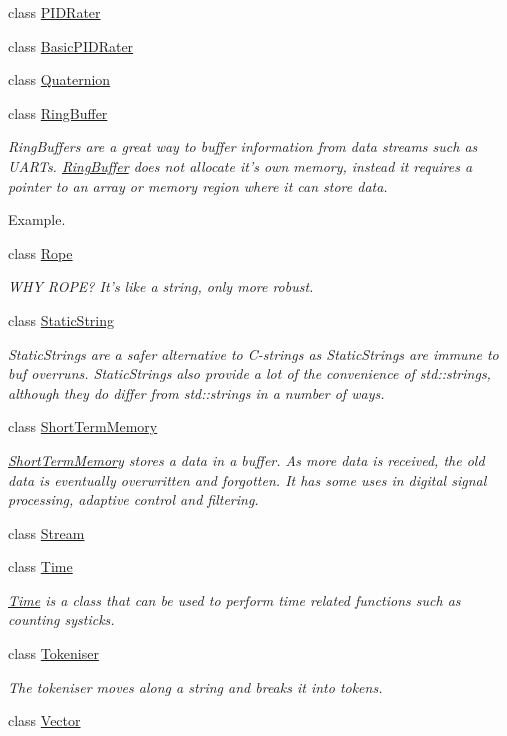\begin{DoxyCompactItemize}
class \hyperlink{classetk_1_1_p_i_d_rater}{P\-I\-D\-Rater}
\item 
class \hyperlink{classetk_1_1_basic_p_i_d_rater}{Basic\-P\-I\-D\-Rater}
\item 
class \hyperlink{classetk_1_1_quaternion}{Quaternion}
\item 
class \hyperlink{classetk_1_1_ring_buffer}{Ring\-Buffer}
\begin{DoxyCompactList}\small\item\em Ring\-Buffers are a great way to buffer information from data streams such as U\-A\-R\-Ts. \hyperlink{classetk_1_1_ring_buffer}{Ring\-Buffer} does not allocate it's own memory, instead it requires a pointer to an array or memory region where it can store data. \par
\par
 Example. \end{DoxyCompactList}\item 
class \hyperlink{classetk_1_1_rope}{Rope}
\begin{DoxyCompactList}\small\item\em W\-H\-Y R\-O\-P\-E? It's like a string, only more robust. \end{DoxyCompactList}\item 
class \hyperlink{classetk_1_1_static_string}{Static\-String}
\begin{DoxyCompactList}\small\item\em Static\-Strings are a safer alternative to C-\/strings as Static\-Strings are immune to buf overruns. Static\-Strings also provide a lot of the convenience of std\-::strings, although they do differ from std\-::strings in a number of ways. \end{DoxyCompactList}\item 
class \hyperlink{classetk_1_1_short_term_memory}{Short\-Term\-Memory}
\begin{DoxyCompactList}\small\item\em \hyperlink{classetk_1_1_short_term_memory}{Short\-Term\-Memory} stores a data in a buffer. As more data is received, the old data is eventually overwritten and forgotten. It has some uses in digital signal processing, adaptive control and filtering. \end{DoxyCompactList}\item 
class \hyperlink{classetk_1_1_stream}{Stream}
\item 
class \hyperlink{classetk_1_1_time}{Time}
\begin{DoxyCompactList}\small\item\em \hyperlink{classetk_1_1_time}{Time} is a class that can be used to perform time related functions such as counting systicks. \end{DoxyCompactList}\item 
class \hyperlink{classetk_1_1_tokeniser}{Tokeniser}
\begin{DoxyCompactList}\small\item\em The tokeniser moves along a string and breaks it into tokens. \end{DoxyCompactList}\item 
class \hyperlink{classetk_1_1_vector}{Vector}
\end{DoxyCompactItemize}
